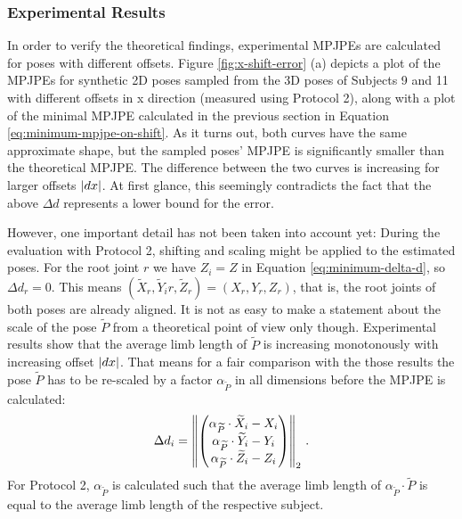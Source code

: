 \subsubsection{Experimental Results}

In order to verify the theoretical findings, experimental MPJPEs are calculated for poses with different offsets.
Figure \ref{fig:x-shift-error} (a) depicts a plot of the MPJPEs for synthetic 2D poses sampled from the 3D poses of Subjects 9 and 11 with different offsets in x direction (measured using Protocol 2), along with a plot of the minimal MPJPE calculated in the previous section in Equation \eqref{eq:minimum-mpjpe-on-shift}.
As it turns out, both curves have the same approximate shape, but the sampled poses' MPJPE is significantly smaller than the theoretical MPJPE.
The difference between the two curves is increasing for larger offsets $\abs{dx}$.
At first glance, this seemingly contradicts the fact that the above $\Delta d$ represents a lower bound for the error.

However, one important detail has not been taken into account yet:
During the evaluation with Protocol 2, shifting and scaling might be applied to the estimated poses. 
For the root joint $r$ we have $Z_i = Z$ in Equation \eqref{eq:minimum-delta-d}, so $\Delta d_r = 0$. 
This means $(\widetilde{X}_r, \widetilde{Y}_ir, \widetilde{Z}_r) = (X_r, Y_r, Z_r)$, that is, the root joints of both poses are already aligned.
It is not as easy to make a statement about the scale of the pose $\widetilde{P}$ from a theoretical point of view only though.
Experimental results show that the average limb length of $\widetilde{P}$ is increasing monotonously with increasing offset $\abs{dx}$.
That means for a fair comparison with the those results the pose $\widetilde{P}$ has to be re-scaled by a factor $\alpha_{\widetilde{P}}$ in all dimensions before the MPJPE is calculated:
\begin{equation}
	\Delta d_i = \norm{ 
	\begin{pmatrix}
		\alpha_{\widetilde{P}} \cdot \widetilde{X}_i - X_i \\
		\alpha_{\widetilde{P}} \cdot \widetilde{Y}_i - Y_i \\
		\alpha_{\widetilde{P}} \cdot \widetilde{Z}_i - Z_i
	\end{pmatrix}
	}_2 \ .
\end{equation}
For Protocol 2, $\alpha_{\widetilde{P}}$ is calculated such that the average limb length of $\alpha_{\widetilde{P}} \cdot \widetilde{P}$ is equal to the average limb length of the respective subject.

